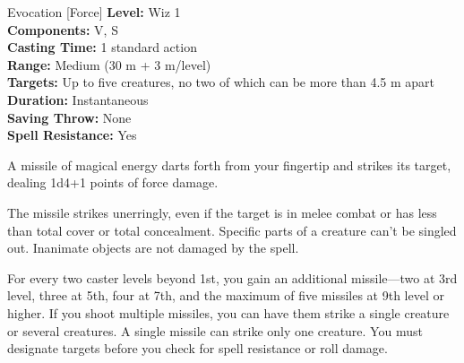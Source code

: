 {Evocation [Force]}
{
	\textbf{Level:}
	Wiz 1\\
	\textbf{Components:}
	V, S\\
	\textbf{Casting Time:}
	1 standard action\\
	\textbf{Range:}
	Medium (30 m + 3 m/level)\\
	\textbf{Targets:}
	Up to five creatures, no two of which can be more than 4.5 m apart\\
	\textbf{Duration:}
	Instantaneous\\
	\textbf{Saving Throw:}
	None\\
	\textbf{Spell Resistance:}
	Yes\\
}
{
	A missile of magical energy darts forth from your fingertip and strikes its target, dealing 1d4+1 points of force damage.

	The missile strikes unerringly, even if the target is in melee combat or has less than total cover or total concealment. Specific parts of a creature can't be singled out. Inanimate objects are not damaged by the spell.

	For every two caster levels beyond 1st, you gain an additional missile---two at 3rd level, three at 5th, four at 7th, and the maximum of five missiles at 9th level or higher. If you shoot multiple missiles, you can have them strike a single creature or several creatures. A single missile can strike only one creature. You must designate targets before you check for spell resistance or roll damage.

}
